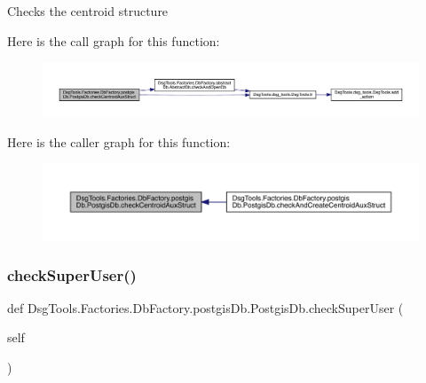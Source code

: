 \begin{DoxyVerb}Checks the centroid structure
\end{DoxyVerb}
 Here is the call graph for this function\+:
\nopagebreak
\begin{figure}[H]
\begin{center}
\leavevmode
\includegraphics[width=350pt]{class_dsg_tools_1_1_factories_1_1_db_factory_1_1postgis_db_1_1_postgis_db_a790e153106a996b3f70cddea3a922391_cgraph}
\end{center}
\end{figure}
Here is the caller graph for this function\+:
\nopagebreak
\begin{figure}[H]
\begin{center}
\leavevmode
\includegraphics[width=350pt]{class_dsg_tools_1_1_factories_1_1_db_factory_1_1postgis_db_1_1_postgis_db_a790e153106a996b3f70cddea3a922391_icgraph}
\end{center}
\end{figure}
\mbox{\label{class_dsg_tools_1_1_factories_1_1_db_factory_1_1postgis_db_1_1_postgis_db_ad207ce5d993c5c3b3d1cc8dcc1403f7d}} 
\subsubsection{\texorpdfstring{check\+Super\+User()}{checkSuperUser()}}
{\footnotesize\ttfamily def Dsg\+Tools.\+Factories.\+Db\+Factory.\+postgis\+Db.\+Postgis\+Db.\+check\+Super\+User (\begin{DoxyParamCaption}\item[{}]{self }\end{DoxyParamCaption})}

